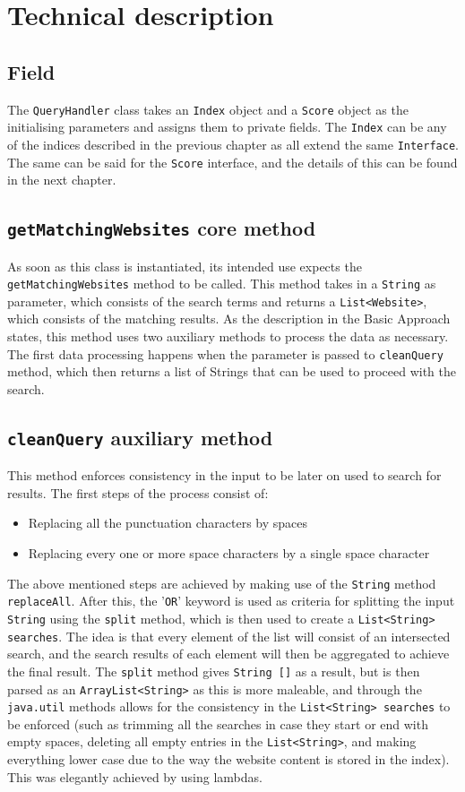 \section{Technical description} %
\subsection{Field}
The {\tt QueryHandler} class takes an {\tt Index} object and a {\tt Score} object as the initialising parameters and assigns them to private fields. The {\tt Index} can be any of the indices described in the previous chapter as all extend the same {\tt Interface}. The same can be said for the {\tt Score} interface, and the details of this can be found in the next chapter. %
\subsection{{\tt getMatchingWebsites} core method}
As soon as this class is instantiated, its intended use expects the {\tt getMatchingWebsites} method to be called. This method takes in a {\tt String} as parameter, which consists of the search terms and returns a {\tt List<Website>}, which consists of the matching results. %
As the description in the Basic Approach states, this method uses two auxiliary methods to process the data as necessary. The first data processing happens when the parameter is passed to {\tt cleanQuery} method, which then returns a list of Strings that can be used to proceed with the search. %
\subsection{{\tt cleanQuery} auxiliary method}
This method enforces consistency in the input to be later on used to search for results.
The first steps of the process consist of:
\begin{itemize}
    \item Replacing all the punctuation characters by spaces
    \item Replacing every one or more space characters by a single space character
\end{itemize}
The above mentioned steps are achieved by making use of the {\tt String} method {\tt replaceAll}.
After this, the '{\tt OR}' keyword is used as criteria for splitting the input {\tt String} using the {\tt split} method, which is then used to create a {\tt List<String> searches}. The idea is that every element of the list will consist of an intersected search, and the search results of each element will then be aggregated to achieve the final result.
The {\tt split} method gives {\tt String []} as a result, but is then parsed as an {\tt ArrayList<String>} as this is more maleable, and through the {\tt java.util} methods allows for the consistency in the {\tt List<String> searches} to be enforced (such as trimming all the searches in case they start or end with empty spaces, deleting all empty entries in the {\tt List<String>}, and making everything lower case due to the way the website content is stored in the index). This was elegantly achieved by using lambdas.
